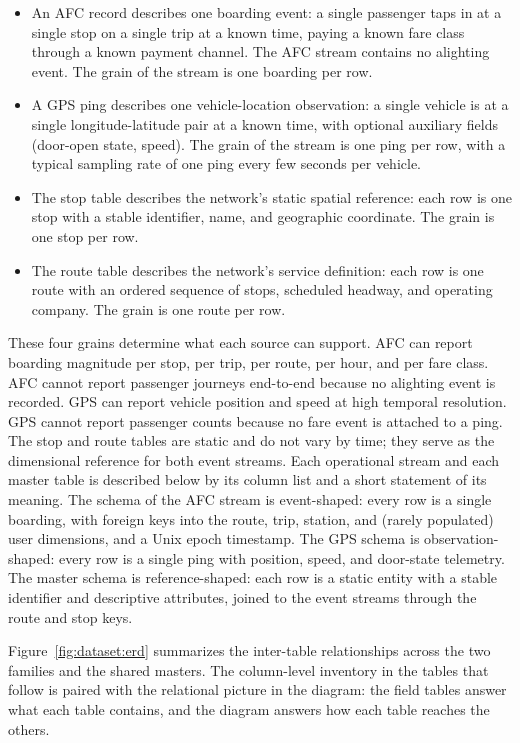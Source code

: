 \begin{itemize}
\item An AFC record describes one boarding event: a single passenger taps in at a single stop on a single trip at a known time, paying a known fare class through a known payment channel. The AFC stream contains no alighting event. The grain of the stream is one boarding per row.
\item A GPS ping describes one vehicle-location observation: a single vehicle is at a single longitude-latitude pair at a known time, with optional auxiliary fields (door-open state, speed). The grain of the stream is one ping per row, with a typical sampling rate of one ping every few seconds per vehicle.
\item The stop table describes the network's static spatial reference: each row is one stop with a stable identifier, name, and geographic coordinate. The grain is one stop per row.
\item The route table describes the network's service definition: each row is one route with an ordered sequence of stops, scheduled headway, and operating company. The grain is one route per row.
\end{itemize}

These four grains determine what each source can support. AFC can report
boarding magnitude per stop, per trip, per route, per hour, and per fare
class. AFC cannot report passenger journeys end-to-end because no alighting
event is recorded. GPS can report vehicle position and speed at high
temporal resolution. GPS cannot report passenger counts because no fare
event is attached to a ping. The stop and route tables are static and do
not vary by time; they serve as the dimensional reference for both event
streams. Each operational stream and each master table is described
below by its column list and a short statement of its meaning. The schema of the AFC stream is event-shaped: every row is a
single boarding, with foreign keys into the route, trip, station, and
(rarely populated) user dimensions, and a Unix epoch timestamp. The GPS
schema is observation-shaped: every row is a single ping with position,
speed, and door-state telemetry. The master schema is reference-shaped:
each row is a static entity with a stable identifier and descriptive
attributes, joined to the event streams through the route and stop keys.

Figure~\ref{fig:dataset:erd} summarizes the inter-table relationships
across the two families and the shared masters. The column-level
inventory in the tables that follow is paired with the relational
picture in the diagram: the field tables answer what each table
contains, and the diagram answers how each table reaches the others.

